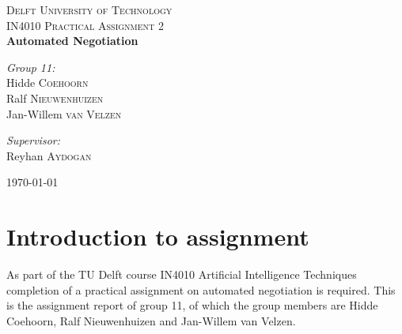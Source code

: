 \documentclass[11pt,a4paper]{article}
\begin{document}
\begin{titlepage}
\begin{center}



\textsc{\LARGE Delft University of Technology}\\[1.5cm]

\textsc{\Large IN4010 Practical Assignment 2}\\[0.5cm]

{ \huge \bfseries Automated Negotiation \\[0.4cm] }


\noindent
\begin{minipage}{0.4\textwidth}
\begin{flushleft} \large
\emph{Group 11:}\\
Hidde \textsc{Coehoorn}\\
Ralf \textsc{Nieuwenhuizen}\\
Jan-Willem \textsc{van Velzen}
\end{flushleft}
\end{minipage}%
\begin{minipage}{0.4\textwidth}
\begin{flushright} \large
\emph{Supervisor:} \\
Reyhan \textsc{Aydogan}
\end{flushright}
\end{minipage}

\vfill

{\large \today}

\end{center}
\end{titlepage}

\newpage


\section{Introduction to assignment}

As part of the TU Delft course IN4010 Artificial Intelligence Techniques completion of a practical assignment on automated negotiation is required. This is the assignment report of group 11, of which the group members are Hidde Coehoorn, Ralf Nieuwenhuizen and Jan-Willem van Velzen.\\
\end{document}
